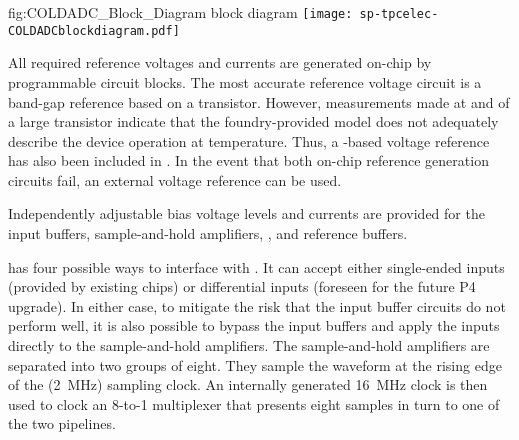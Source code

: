 \begin{dunefigure}
{fig:COLDADC_Block_Diagram}
{ block diagram}
\texttt{[image: sp-tpcelec-COLDADCblockdiagram.pdf]}
\end{dunefigure}

All required reference voltages and currents are generated on-chip by programmable
circuit blocks. The most accurate reference voltage circuit is a band-gap reference
based on a  transistor.  However, measurements made at  and
 of a large  transistor indicate that the foundry-provided  model
does not adequately describe the device operation at \lar temperature.  Thus,
a -based voltage reference has also been included in .
In the event that both on-chip reference generation circuits fail, an external voltage
reference can be used.

Independently adjustable bias voltage levels and currents are provided for the
input buffers, sample-and-hold amplifiers, , and 
reference buffers.

 has four possible ways to interface with .  It
can accept either single-ended inputs (provided by existing 
chips) or differential inputs (foreseen for the future  P4 upgrade).
In either case, to mitigate the risk that the input buffer circuits do not perform
well, it is also possible to bypass the input buffers and apply the inputs directly
to the sample-and-hold amplifiers.  The sample-and-hold amplifiers are separated
into two groups of eight.  They sample the waveform at the rising edge of the
(\SI{2}{MHz}) sampling clock.  An internally generated \SI{16}{MHz} clock is then
used to clock an \num{8}-to-\num{1} multiplexer that presents eight samples in 
turn to one of the two  pipelines.

